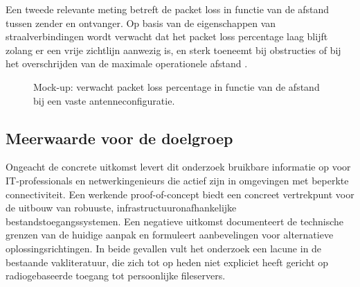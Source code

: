 Een tweede relevante meting betreft de packet loss in functie van de afstand tussen zender en ontvanger. Op basis van de eigenschappen van straalverbindingen wordt verwacht dat het packet loss percentage laag blijft zolang er een vrije zichtlijn aanwezig is, en sterk toeneemt bij obstructies of bij het overschrijden van de maximale operationele afstand \autocite{MicrowavePtP5G}.

\begin{figure}[h]
  \centering
  \caption{Mock-up: verwacht packet loss percentage in functie van de afstand bij een vaste antenneconfiguratie.}
  \label{fig:mock_packetloss}
\end{figure}

\subsection{Meerwaarde voor de doelgroep}

Ongeacht de concrete uitkomst levert dit onderzoek bruikbare informatie op voor IT-professionals en netwerkingenieurs die actief zijn in omgevingen met beperkte connectiviteit. Een werkende proof-of-concept biedt een concreet vertrekpunt voor de uitbouw van robuuste, infrastructuuronafhankelijke bestandstoegangssystemen. Een negatieve uitkomst documenteert de technische grenzen van de huidige aanpak en formuleert aanbevelingen voor alternatieve oplossingsrichtingen. In beide gevallen vult het onderzoek een lacune in de bestaande vakliteratuur, die zich tot op heden niet expliciet heeft gericht op radiogebaseerde toegang tot persoonlijke fileservers.